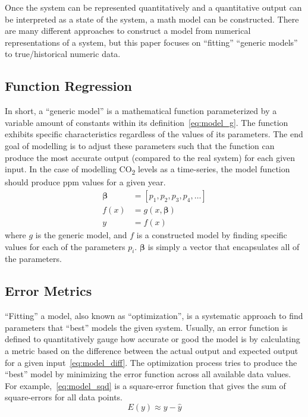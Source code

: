 \documentclass[12pt]{mcmthesis}
\begin{document}
    Once the system can be represented quantitatively and a quantitative output can be interpreted as a state of the system, a math model can be constructed. There are many different approaches to construct a model from numerical representations of a system, but this paper focuses on ``fitting'' ``generic models'' to true/historical numeric data.

    \subsection*{Function Regression}

    In short, a ``generic model'' is a mathematical function parameterized by a variable amount of constants within its definition~\eqref{eq:model_g}. The function exhibits specific characteristics regardless of the values of its parameters. The end goal of modelling is to adjust these parameters such that the function can produce the most accurate output (compared to the real system) for each given input. In the case of modelling CO\textsubscript{2} levels as a time-series, the model function should produce ppm values for a given year.
%
    \begin{equation}
        \begin{aligned}
            \bm{\beta} &= [p_1, p_2, p_3, p_4, \dots] \\
            f(x) &= g(x, \bm{\beta}) \\
            y &= f(x)
        \end{aligned}
        \label{eq:model_g}
    \end{equation}
%
    \noindent where $g$ is the generic model, and $f$ is a constructed model by finding specific values for each of the parameters $p_i$. $\bm{\beta}$ is simply a vector that encapsulates all of the parameters.

    \subsection*{Error Metrics}

    ``Fitting'' a model, also known as ``optimization'', is a systematic approach to find parameters that ``best'' models the given system. Usually, an error function is defined to quantitatively gauge how accurate or good the model is by calculating a metric based on the difference between the actual output and expected output for a given input~\eqref{eq:model_diff}. The optimization process tries to produce the ``best'' model by minimizing the error function across all available data values. For example,~\eqref{eq:model_sqd} is a square-error function that gives the sum of square-errors for all data points.
%
    \begin{equation}
        E(y) \approx y - \hat y
        \label{eq:model_diff}
    \end{equation}
\end{document}
